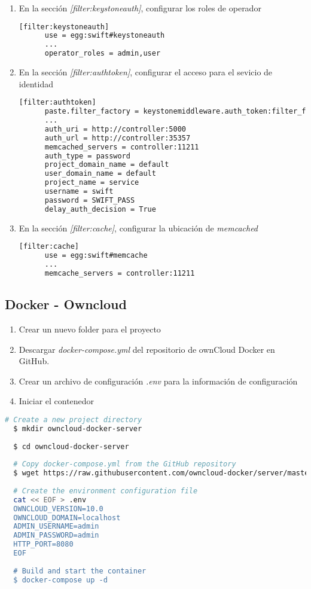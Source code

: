 \documentclass{article}
\begin{document}
\begin{enumerate}
\begin{enumerate}
    \item En la secci\'on \emph{[filter:keystoneauth]}, configurar los roles de operador
    \begin{lstlisting}[language=bash]
      [filter:keystoneauth]
      use = egg:swift#keystoneauth
      ...
      operator_roles = admin,user
    \end{lstlisting}

    \item En la secci\'on \emph{[filter:authtoken]}, configurar el acceso para el sevicio de identidad
    \begin{lstlisting}[language=bash]
      [filter:authtoken]
      paste.filter_factory = keystonemiddleware.auth_token:filter_factory
      ...
      auth_uri = http://controller:5000
      auth_url = http://controller:35357
      memcached_servers = controller:11211
      auth_type = password
      project_domain_name = default
      user_domain_name = default
      project_name = service
      username = swift
      password = SWIFT_PASS
      delay_auth_decision = True
    \end{lstlisting}

    \item En la secci\'on \emph{[filter:cache]}, configurar la ubicaci\'on de \emph{memcached}
    \begin{lstlisting}[language=bash]
      [filter:cache]
      use = egg:swift#memcache
      ...
      memcache_servers = controller:11211
    \end{lstlisting}
  \end{enumerate}
\end{enumerate}

\subsection{Docker - Owncloud}
\begin{enumerate}
  \item Crear un nuevo folder para el proyecto
  \item Descargar \emph{docker-compose.yml} del repositorio de ownCloud Docker en GitHub.
  \item Crear un archivo de configuraci\'on \emph{.env} para la informaci\'on de configuraci\'on
  \item Iniciar el contenedor
\end{enumerate}
\begin{lstlisting}[language=bash]
  # Create a new project directory
  $ mkdir owncloud-docker-server
  
  $ cd owncloud-docker-server
  
  # Copy docker-compose.yml from the GitHub repository
  $ wget https://raw.githubusercontent.com/owncloud-docker/server/master/docker-compose.yml
  
  # Create the environment configuration file
  cat << EOF > .env
  OWNCLOUD_VERSION=10.0
  OWNCLOUD_DOMAIN=localhost
  ADMIN_USERNAME=admin
  ADMIN_PASSWORD=admin
  HTTP_PORT=8080
  EOF
  
  # Build and start the container
  $ docker-compose up -d
\end{lstlisting}
\end{document}
